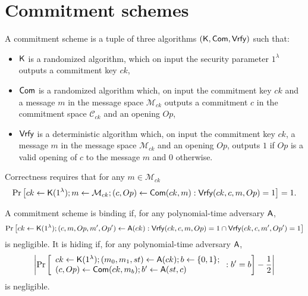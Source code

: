 \section{Commitment schemes}


\begin{definition} A commitment scheme is a tuple of three algorithms 
	$(\mathsf{K},\mathsf{Com},\mathsf{Vrfy})$ such that:
	\begin{itemize} 
		\item  $\mathsf{K}$ is a randomized algorithm, which on input the security parameter 
		$1^{\lambda}$ outputs a commitment key $ck$,
		\item $\mathsf{Com}$ is a randomized algorithm which, on input the commitment key $ck$ and a message 
		$m$ in the message space $\mathcal{M}_{ck}$ outputs a commitment $c$ in the commitment space $\mathcal{C}_{ck}$ and an opening $Op$, 
	\item $\mathsf{Vrfy}$ is a deterministic algorithm which, on input the commitment key $ck$,  a message 
	$m$ in the message space $\mathcal{M}_{ck}$ and an opening $Op$, outputs $1$ if $Op$ is a valid opening of $c$ to the message $m$ and $0$ otherwise. 
	\end{itemize}
\end{definition}

Correctness requires that for any $m \in \mathcal{M}_{ck}$
$$\Pr\left[ck \gets \mathsf{K}(1^{\lambda}); m \gets \mathcal{M}_{ck}; 
(c, Op) \gets \mathsf{Com}(ck,m): \mathsf{Vrfy}(ck,c,m,Op)=1 \right]=1.$$


\begin{definition}  A commitment scheme is binding if, for any polynomial-time adversary $\mathsf{A}$, 
	$$\Pr\left[ck \gets \mathsf{K}(1^{\lambda}); (c,m,Op,m',Op') \gets \mathsf{A}(ck): \mathsf{Vrfy}(ck,c,m,Op)=1 \cap \mathsf{Vrfy}(ck,c,m',Op')=1\right] $$
	is negligible.  It is hiding if, for any polynomial-time adversary $\mathsf{A}$,
	$$\left|\Pr\left[ \begin{array}{l} ck \gets \mathsf{K}(1^{\lambda}); (m_0,m_1,st) \gets \mathsf{A}(ck); b \gets \{0,1\};\\ (c,Op) \gets \mathsf{Com}(ck,m_b); b' \gets \mathsf{A}(st,c)
                      \end{array} : b'=b\right] -\dfrac{1}{2} \right|$$
	is negligible.
\end{definition}




